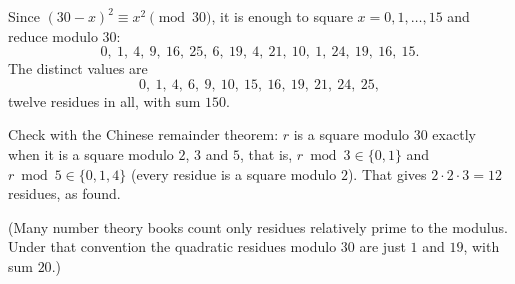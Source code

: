 Since $(30-x)^2\equiv x^2\pmod{30}$, it is enough to square $x=0,1,\dots,15$ and reduce modulo $30$:
\[0,\ 1,\ 4,\ 9,\ 16,\ 25,\ 6,\ 19,\ 4,\ 21,\ 10,\ 1,\ 24,\ 19,\ 16,\ 15 .\]
The distinct values are
\[0,\ 1,\ 4,\ 6,\ 9,\ 10,\ 15,\ 16,\ 19,\ 21,\ 24,\ 25 ,\]
twelve residues in all, with sum $\boxed{150}$.

Check with the Chinese remainder theorem: $r$ is a square modulo $30$ exactly when it is a square modulo $2$, $3$ and $5$, that is, $r\bmod3\in\{0,1\}$ and $r\bmod5\in\{0,1,4\}$ (every residue is a square modulo $2$). That gives $2\cdot2\cdot3=12$ residues, as found.

(Many number theory books count only residues relatively prime to the modulus. Under that convention the quadratic residues modulo $30$ are just $1$ and $19$, with sum $20$.)
